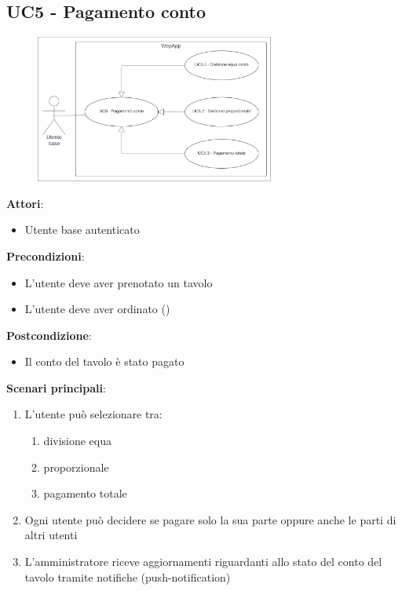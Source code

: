 \subsection{UC5 - Pagamento conto}\label{usecase:5}
\begin{figure}[H]
    \centering
    \includegraphics[width=0.7\textwidth]{ucd/UCD5.png}
\end{figure}
\textbf{Attori}:
\begin{itemize}
    \item Utente base autenticato
\end{itemize}
\textbf{Precondizioni}:
\begin{itemize}
    \item L'utente deve aver prenotato un tavolo
    \item L'utente deve aver ordinato ()
\end{itemize}
\textbf{Postcondizione}:
\begin{itemize}
    \item Il conto del tavolo è stato pagato
\end{itemize}
\textbf{Scenari principali}:
\begin{enumerate}
    \item L'utente può selezionare tra:
    \begin{enumerate}
        \item divisione equa
        \item proporzionale
        \item pagamento totale
    \end{enumerate}
    \item Ogni utente può decidere se pagare solo la sua parte oppure anche le parti di altri utenti
    \item L'amministratore riceve aggiornamenti riguardanti allo stato del conto del tavolo tramite notifiche (push-notification)
\end{enumerate}



\newpage